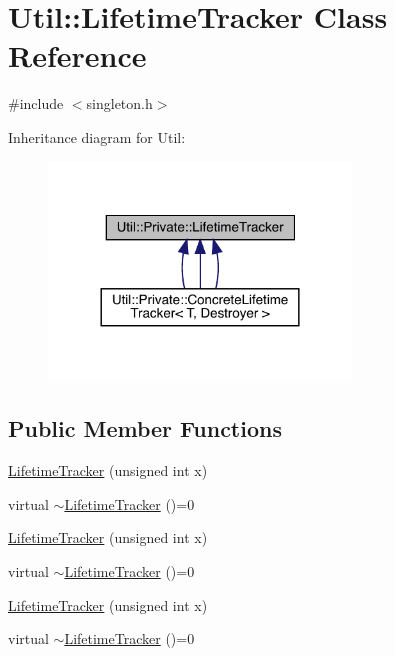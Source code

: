 \hypertarget{classUtil_1_1Private_1_1LifetimeTracker}{}\section{Util\+:\+:Lifetime\+Tracker Class Reference}
\label{classUtil_1_1Private_1_1LifetimeTracker}


{\ttfamily \#include $<$singleton.\+h$>$}



Inheritance diagram for Util\+:
\nopagebreak
\begin{figure}[H]
\begin{center}
\leavevmode
\includegraphics[width=228pt]{d1/d15/classUtil_1_1Private_1_1LifetimeTracker__inherit__graph}
\end{center}
\end{figure}
\subsection*{Public Member Functions}
\begin{DoxyCompactItemize}
\item 
\mbox{\hyperlink{classUtil_1_1Private_1_1LifetimeTracker_adfc292ac14a2b71f88059accf8925772}{Lifetime\+Tracker}} (unsigned int x)
\item 
virtual \mbox{\hyperlink{classUtil_1_1Private_1_1LifetimeTracker_aa4c2c67352679440491759ed6fd0a7e4}{$\sim$\+Lifetime\+Tracker}} ()=0
\item 
\mbox{\hyperlink{classUtil_1_1Private_1_1LifetimeTracker_adfc292ac14a2b71f88059accf8925772}{Lifetime\+Tracker}} (unsigned int x)
\item 
virtual \mbox{\hyperlink{classUtil_1_1Private_1_1LifetimeTracker_a97bbcdce3400b78bd3d1a62f9760d6ab}{$\sim$\+Lifetime\+Tracker}} ()=0
\item 
\mbox{\hyperlink{classUtil_1_1Private_1_1LifetimeTracker_adfc292ac14a2b71f88059accf8925772}{Lifetime\+Tracker}} (unsigned int x)
\item 
virtual \mbox{\hyperlink{classUtil_1_1Private_1_1LifetimeTracker_a97bbcdce3400b78bd3d1a62f9760d6ab}{$\sim$\+Lifetime\+Tracker}} ()=0
\end{DoxyCompactItemize}
